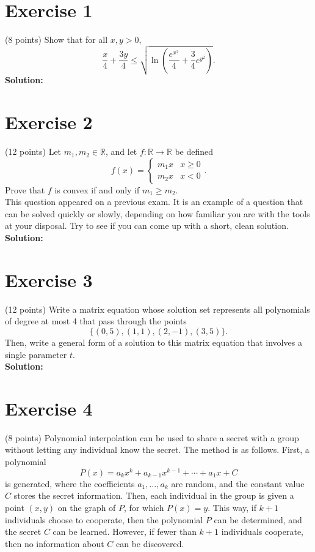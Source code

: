 \documentclass{article}
\begin{document}
\section*{Exercise 1}
(8 points) Show that for all $x, y > 0$,
\[
\frac{x}{4} + \frac{3y}{4} \leq \sqrt{\ln \left(\frac{e^{x^2}}{4} + \frac{3}{4}e^{y^2}\right)}.
\]
\textbf{Solution:} \\


\newpage

\section*{Exercise 2}
(12 points) Let $m_1, m_2 \in \mathbb{R}$, and let $f : \mathbb{R} \to \mathbb{R}$ be defined
\[
f(x) = 
\begin{cases}
m_1 x & x \geq 0 \\
m_2 x & x < 0
\end{cases}.
\]
Prove that $f$ is convex if and only if $m_1 \geq m_2$. \\

This question appeared on a previous exam. It is an example of a question that can be solved quickly or slowly, depending on how familiar you are with the tools at your disposal. Try to see if you can come up with a short, clean solution. \\

\textbf{Solution:} \\



\newpage

\section*{Exercise 3}
(12 points) Write a matrix equation whose solution set represents all polynomials of degree at most 4 that pass through the points
\[
\{(0,5), (1,1), (2,-1), (3,5)\}.
\]
Then, write a general form of a solution to this matrix equation that involves a single parameter $t$. \\

\textbf{Solution:} \\



\newpage

\section*{Exercise 4}
(8 points) Polynomial interpolation can be used to share a secret with a group without letting any individual know the secret. The method is as follows. First, a polynomial
\[
P(x) = a_k x^k + a_{k-1}x^{k-1} + \cdots + a_1 x + C
\]
is generated, where the coefficients $a_1, \ldots, a_k$ are random, and the constant value $C$ stores the secret information. Then, each individual in the group is given a point $(x, y)$ on the graph of $P$, for which $P(x) = y$. This way, if $k + 1$ individuals choose to cooperate, then the polynomial $P$ can be determined, and the secret $C$ can be learned. However, if fewer than $k + 1$ individuals cooperate, then no information about $C$ can be discovered. \\
\end{document}
